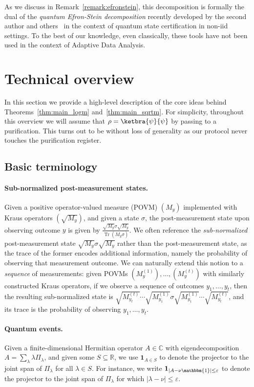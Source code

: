 \documentclass[10pt]{article}
\renewcommand{\epsilon}{\varepsilon}
\DeclareMathOperator{\Tr}{Tr}
\newcommand{\Id}{\mathbbm{1}}
\begin{document}
As we discuss in Remark~\ref{remark:efronstein}, this decomposition is formally the dual of the \emph{quantum Efron-Stein decomposition} recently developed by the second author and others~\cite{de2025non} in the context of quantum state certification in non-iid settings. To the best of our knowledge, even classically, these tools have not been used in the context of Adaptive Data Analysis.


\section{Technical overview}

In this section we provide a high-level description of the core ideas behind Theorems~\ref{thm:main_logm} and~\ref{thm:main_sqrtm}. For simplicity, throughout this overview we will assume that $\rho = \ketbra{\psi}{\psi}$ by passing to a purification. This turns out to be without loss of generality as our protocol never touches the purification register.

\subsection{Basic terminology}

\paragraph{Sub-normalized post-measurement states.} Given a positive operator-valued measure (POVM) $(M_y)$ implemented with Kraus operators $(\sqrt{M_y})$, and given a state $\sigma$, the post-measurement state upon observing outcome $y$ is given by $\frac{\sqrt{M_y}\sigma\sqrt{M_y}}{\Tr(M_y\sigma)}$. We often reference the \emph{sub-normalized} post-measurement state $\sqrt{M_y}\sigma\sqrt{M_y}$ rather than the post-measurement state, as the trace of the former encodes additional information, namely the probability of observing that measurement outcome. We can naturally extend this notion to a \emph{sequence} of measurements: given POVMs $(M^{(1)}_y),\ldots,(M^{(t)}_y)$ with similarly constructed Kraus operators, if we observe a sequence of outcomes $y_1,\ldots,y_t$, then the resulting sub-normalized state is $\sqrt{M^{(t)}_{y_t}}\cdots \sqrt{M^{(1)}_{y_1}} \sigma \sqrt{M^{(1)}_{y_1}}\cdots \sqrt{M^{(t)}_{y_t}}$, and its trace is the probability of observing $y_1,\ldots,y_t$.

\paragraph{Quantum events.} Given a finite-dimensional Hermitian operator $A\in\mathbb{C}$ with eigendecomposition $A = \sum_\lambda \lambda \Pi_\lambda$, and given some $S\subseteq\mathbb{R}$, we use $\mathbf{1}_{A\in S}$ to denote the projector to the joint span of $\Pi_{\lambda}$ for all $\lambda\in S$. For instance, we write $\mathbf{1}_{|A - \nu \Id| \le \epsilon}$ to denote the projector to the joint span of $\Pi_\lambda$ for which $|\lambda - \nu| \le \epsilon$.
\end{document}
